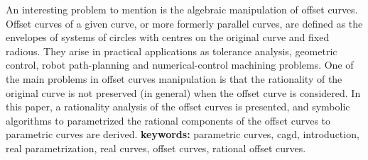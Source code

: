 An interesting problem to mention is the algebraic manipulation of offset  
curves. Offset curves of a given curve, or more formerly parallel curves, 
are defined as the envelopes of systems of circles with centres on the 
original curve and fixed radious. They  arise in practical applications 
as tolerance a\-na\-ly\-sis, geometric control, robot path-planning and 
numerical-control machining problems. One of the main 
problems in offset curves manipulation is that the rationality of the 
original curve is not preserved (in general) when the offset curve is 
considered. In this paper,  a rationality analysis of the offset 
curves is presented, and symbolic algorithms to parametrized the rational 
components of the offset curves to parametric curves are derived.
\vspace{2 mm}
\newline
{\bf keywords:} parametric curves, cagd, introduction, real parametrization,
real curves, offset curves, rational offset curves. 


